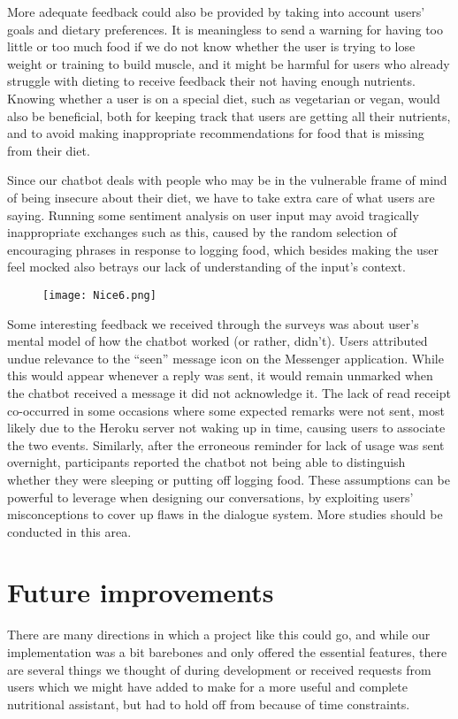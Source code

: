 More adequate feedback could also be provided by taking into account users' goals and dietary preferences. It is meaningless to send a warning for having too little or too much food if we do not know whether the user is trying to lose weight or training to build muscle, and it might be harmful for users who already struggle with dieting to receive feedback their not having enough nutrients. Knowing whether a user is on a special diet, such as vegetarian or vegan, would also be beneficial, both for keeping track that users are getting all their nutrients, and to avoid making inappropriate recommendations for food that is missing from their diet. 

Since our chatbot deals with people who may be in the vulnerable frame of mind of being insecure about their diet, we have to take extra care of what users are saying. Running some sentiment analysis on user input may avoid tragically inappropriate exchanges such as this, caused by the random selection of encouraging phrases in response to logging food, which besides making the user feel mocked also betrays our lack of understanding of the input's context. \\

\begin{figure}[h!]
  \texttt{[image: Nice6.png]}
\end{figure}

Some interesting feedback we received through the surveys was about user's mental model of how the chatbot worked (or rather, didn't). Users attributed undue relevance to the ``seen'' message icon on the Messenger application. While this would appear whenever a reply was sent, it would remain unmarked when the chatbot received a message it did not acknowledge it. The lack of read receipt co-occurred in some occasions where some expected remarks were not sent, most likely due to the Heroku server not waking up in time, causing users to associate the two events. Similarly, after the erroneous reminder for lack of usage was sent overnight, participants reported the chatbot not being able to distinguish whether they were sleeping or putting off logging food. These assumptions can be powerful to leverage when designing our conversations, by exploiting users' misconceptions to cover up flaws in the dialogue system. More studies should be conducted in this area. 

\section{Future improvements} 
There are many directions in which a project like this could go, and while our implementation was a bit barebones and only offered the essential features, there are several things we thought of during development or received requests from users which we might have added to make for a more useful and complete nutritional assistant, but had to hold off from because of time constraints. 

